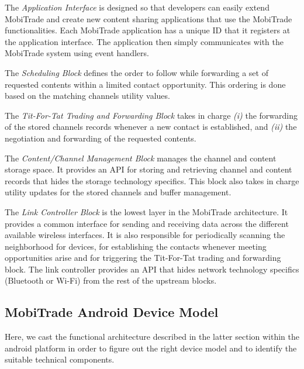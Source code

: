 The \textit{Application Interface} is designed so that developers can easily extend MobiTrade and create new content sharing applications that use the MobiTrade functionalities. Each MobiTrade application has a unique ID that it registers at the application interface. The application then simply communicates with the MobiTrade system using event handlers.

The \textit{Scheduling Block} defines the order to follow while forwarding a set of requested contents within a limited contact opportunity. This ordering is done based on the matching channels utility values.

The \textit{Tit-For-Tat Trading and Forwarding Block} takes in charge \emph{(i)} the forwarding of the stored channels records whenever a new contact is established, and \emph{(ii)} the negotiation and forwarding of the requested contents.

The \textit{Content/Channel Management Block} manages the channel and content storage space. It provides an API for storing and retrieving channel and content records that hides the storage technology specifics. This block also takes in charge utility updates for the stored channels and buffer management.

The \textit{Link Controller Block} is the lowest layer in the MobiTrade architecture. It provides a common interface for sending and receiving data across the different available wireless interfaces. It is also responsible for periodically scanning the neighborhood for devices, for establishing the contacts whenever meeting opportunities arise and for triggering the Tit-For-Tat trading and forwarding block. The link controller provides an API that hides network technology specifics (Bluetooth or Wi-Fi) from the rest of the upstream blocks.

\subsection{MobiTrade Android Device Model}
\label{MobiTrade-device-model}
 
Here, we  cast the functional architecture described in the latter section within the android platform in order to figure out the right device model and to identify the suitable technical components. 

